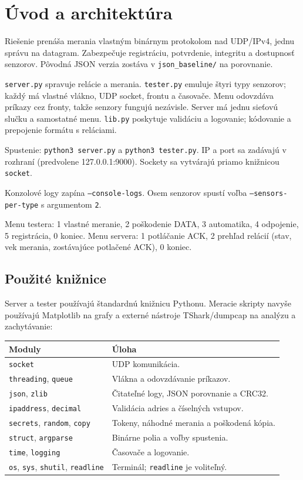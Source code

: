 \documentclass[12pt,a4paper]{article}
\begin{document}
\pksdocument

\section{Úvod a architektúra}

Riešenie prenáša merania vlastným binárnym protokolom nad UDP/IPv4, jednu správu na datagram. Zabezpečuje registráciu, potvrdenie, integritu a dostupnosť senzorov. Pôvodná JSON verzia zostáva v \texttt{json\_baseline/} na porovnanie.

\texttt{server.py} spravuje relácie a merania. \texttt{tester.py} emuluje štyri typy senzorov; každý má vlastné vlákno, UDP socket, frontu a časovače. Menu odovzdáva príkazy cez fronty, takže senzory fungujú nezávisle. Server má jednu sieťovú slučku a samostatné menu. \texttt{lib.py} poskytuje validáciu a logovanie;  kódovanie a  prepojenie formátu s reláciami.

Spustenie: \texttt{python3 server.py} a \texttt{python3 tester.py}. IP a port sa zadávajú v rozhraní (predvolene 127.0.0.1:9000). Sockety sa vytvárajú priamo knižnicou \texttt{socket}.

Konzolové logy zapína \texttt{--console-logs}. Osem senzorov spustí voľba \texttt{--sensors-per-type} s argumentom \texttt{2}.

Menu testera: 1 vlastné meranie, 2 poškodenie DATA, 3 automatika, 4 odpojenie, 5 registrácia, 0 koniec. Menu servera: 1 potláčanie ACK, 2 prehľad relácií (stav, vek merania, zostávajúce potlačené ACK), 0 koniec.

\subsection{Použité knižnice}

Server a tester používajú štandardnú knižnicu Pythonu. Meracie skripty navyše používajú Matplotlib na grafy a externé nástroje TShark/dumpcap na analýzu a zachytávanie:
\begin{center}
\small\singlespacing
\begin{tabular}{p{6cm} p{7cm}}
\hline
\textbf{Moduly} & \textbf{Úloha} \\
\hline
\texttt{socket} & UDP komunikácia. \\
\texttt{threading}, \texttt{queue} & Vlákna a odovzdávanie príkazov. \\
\texttt{json}, \texttt{zlib} & Čitateľné logy, JSON porovnanie a CRC32. \\
\texttt{ipaddress}, \texttt{decimal} & Validácia adries a číselných vstupov. \\
\texttt{secrets}, \texttt{random}, \texttt{copy} & Tokeny, náhodné merania a poškodená kópia. \\
\texttt{struct}, \texttt{argparse} & Binárne polia a voľby spustenia. \\
\texttt{time}, \texttt{logging} & Časovače a logovanie. \\
\texttt{os}, \texttt{sys}, \texttt{shutil}, \texttt{readline} & Terminál; \texttt{readline} je voliteľný. \\
\hline
\end{tabular}
\end{center}
\end{document}
